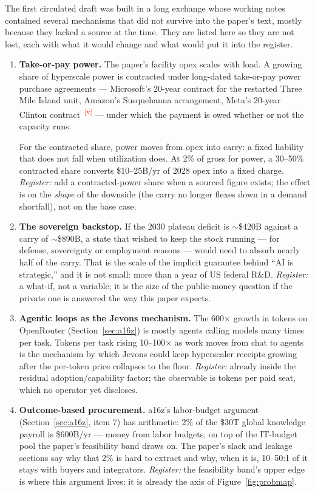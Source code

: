 \documentclass[11pt,letterpaper]{article}
\newcommand{\verify}{\textsuperscript{\textcolor{red}{[v]}}}
\begin{document}
The first circulated draft was built in a long exchange whose working notes contained several mechanisms that did not survive into the paper's text, mostly because they lacked a source at the time. They are listed here so they are not lost, each with what it would change and what would put it into the register.
\begin{enumerate}
\item \textbf{Take-or-pay power.} The paper's facility opex scales with load. A growing share of hyperscale power is contracted under long-dated take-or-pay power purchase agreements --- Microsoft's 20-year contract for the restarted Three Mile Island unit, Amazon's Susquehanna arrangement, Meta's 20-year Clinton contract~\cite{ref:ppa_press}\verify{} --- under which the payment is owed whether or not the capacity runs.

For the contracted share, power moves from opex into carry: a fixed liability that does not fall when utilization does. At 2\% of gross for power, a 30--50\% contracted share converts \$10--25B/yr of 2028 opex into a fixed charge. \emph{Register:} add a contracted-power share when a sourced figure exists; the effect is on the \emph{shape} of the downside (the carry no longer flexes down in a demand shortfall), not on the base case.
\item \textbf{The sovereign backstop.} If the 2030 plateau deficit is $\sim$\$420B against a carry of $\sim$\$890B, a state that wished to keep the stock running --- for defense, sovereignty or employment reasons --- would need to absorb nearly half of the carry. That is the scale of the implicit guarantee behind ``AI is strategic,'' and it is not small: more than a year of US federal R\&D. \emph{Register:} a what-if, not a variable; it is the size of the public-money question if the private one is answered the way this paper expects.
\item \textbf{Agentic loops as the Jevons mechanism.} The 600$\times$ growth in tokens on OpenRouter (Section~\ref{sec:a16z}) is mostly agents calling models many times per task. Tokens per task rising 10--100$\times$ as work moves from chat to agents is the mechanism by which Jevons could keep hyperscaler receipts growing after the per-token price collapses to the floor. \emph{Register:} already inside the residual adoption/capability factor; the observable is tokens per paid seat, which no operator yet discloses.
\item \textbf{Outcome-based procurement.} a16z's labor-budget argument (Section~\ref{sec:a16z}, item 7) has arithmetic: 2\% of the \$30T global knowledge payroll is \$600B/yr --- money from labor budgets, on top of the IT-budget pool the paper's feasibility band draws on. The paper's slack and leakage sections say why that 2\% is hard to extract and why, when it is, 10--50:1 of it stays with buyers and integrators. \emph{Register:} the feasibility band's upper edge is where this argument lives; it is already the axis of Figure~\ref{fig:probmap}.
\end{enumerate}
\end{document}

